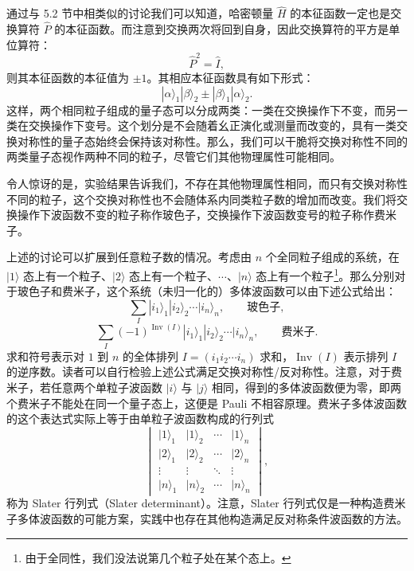 通过与 5.2 节中相类似的讨论我们可以知道，哈密顿量 $\hat H$ 的本征函数一定也是交换算符 $\hat P$ 的本征函数。而注意到交换两次将回到自身，因此交换算符的平方是单位算符：
\begin{equation}
 \hat P^2=\hat I,
\tag{6.4.4}
\end{equation}
则其本征函数的本征值为 $\pm1$。其相应本征函数具有如下形式：
\begin{equation}
 |\alpha\rangle_1|\beta\rangle_2\pm|\beta\rangle_1|\alpha\rangle_2.
\tag{6.4.5}
\end{equation}
这样，两个相同粒子组成的量子态可以分成两类：一类在交换操作下不变，而另一类在交换操作下变号。这个划分是不会随着幺正演化或测量而改变的，具有一类交换对称性的量子态始终会保持该对称性。那么，我们可以干脆将交换对称性不同的两类量子态视作两种不同的粒子，尽管它们其他物理属性可能相同。

令人惊讶的是，实验结果告诉我们，不存在其他物理属性相同，而只有交换对称性不同的粒子，这个交换对称性也不会随体系内同类粒子数的增加而改变。我们将交换操作下波函数不变的粒子称作玻色子，交换操作下波函数变号的粒子称作费米子。

上述的讨论可以扩展到任意粒子数的情况。考虑由 $n$ 个全同粒子组成的系统，在 $|1\rangle$ 态上有一个粒子、$|2\rangle$ 态上有一个粒子、$\cdots$、$|n\rangle$ 态上有一个粒子\footnote{由于全同性，我们没法说第几个粒子处在某个态上。}。那么分别对于玻色子和费米子，这个系统（未归一化的）多体波函数可以由下述公式给出：
\begin{equation}
 \sum_I |i_1\rangle_1|i_2\rangle_2\cdots|i_n\rangle_n,
 \qquad \text{玻色子},
\tag{6.4.6}
\end{equation}
\begin{equation}
 \sum_I(-1)^{\operatorname{Inv}(I)}|i_1\rangle_1|i_2\rangle_2\cdots|i_n\rangle_n,
 \qquad \text{费米子}.
\tag{6.4.7}
\end{equation}
求和符号表示对 $1$ 到 $n$ 的全体排列 $I=(i_1i_2\cdots i_n)$ 求和，$\operatorname{Inv}(I)$ 表示排列 $I$ 的逆序数。读者可以自行检验上述公式满足交换对称性/反对称性。注意，对于费米子，若任意两个单粒子波函数 $|i\rangle$ 与 $|j\rangle$ 相同，得到的多体波函数便为零，即两个费米子不能处在同一个量子态上，这便是 Pauli 不相容原理。费米子多体波函数的这个表达式实际上等于由单粒子波函数构成的行列式
\begin{equation}
 \begin{vmatrix}
 |1\rangle_1&|1\rangle_2&\cdots&|1\rangle_n\\
 |2\rangle_1&|2\rangle_2&\cdots&|2\rangle_n\\
 \vdots&\vdots&\ddots&\vdots\\
 |n\rangle_1&|n\rangle_2&\cdots&|n\rangle_n
 \end{vmatrix},
\tag{6.4.8}
\end{equation}
称为 Slater 行列式（Slater determinant）。注意，Slater 行列式仅是一种构造费米子多体波函数的可能方案，实践中也存在其他构造满足反对称条件波函数的方法。

